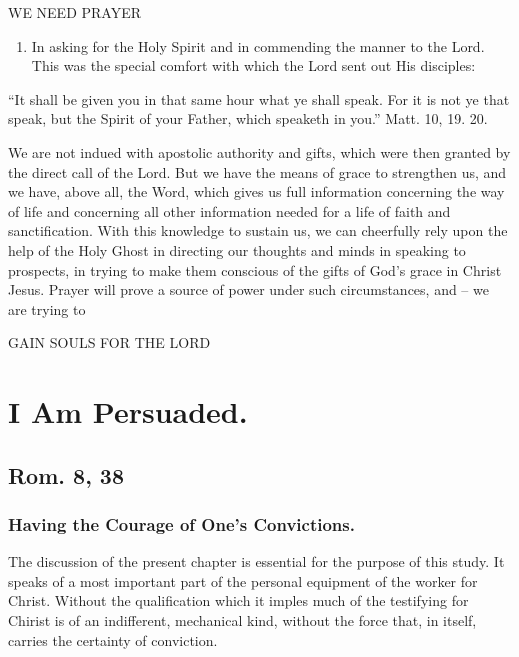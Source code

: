 \documentclass[
]{book}
\providecommand{\tightlist}{%
  \setlength{\itemsep}{0pt}\setlength{\parskip}{0pt}}
\begin{document}
WE NEED PRAYER

\begin{enumerate}
\def\labelenumi{\alph{enumi}.}
\setcounter{enumi}{4}
\tightlist
\item
  In asking for the Holy Spirit and in commending the manner to the Lord. This was the special comfort with which the Lord sent out His disciples:
\end{enumerate}

``It shall be given you in that same hour what ye shall speak. For it is not ye that speak, but the Spirit of your Father, which speaketh in you.'' Matt. 10, 19. 20.

We are not indued with apostolic authority and gifts, which were then granted by the direct call of the Lord. But we have the means of grace to strengthen us, and we have, above all, the Word, which gives us full information concerning the way of life and concerning all other information needed for a life of faith and sanctification. With this knowledge to sustain us, we can cheerfully rely upon the help of the Holy Ghost in directing our thoughts and minds in speaking to prospects, in trying to make them conscious of the gifts of God's grace in Christ Jesus. Prayer will prove a source of power under such circumstances, and -- we are trying to

\begin{center} GAIN SOULS FOR THE LORD \end{center}

\chapter{I Am Persuaded.}\label{i-am-persuaded.}

\section*{Rom. 8, 38}\label{rom.-8-38}

\subsection*{Having the Courage of One's Convictions.}\label{having-the-courage-of-ones-convictions.}

The discussion of the present chapter is essential for the purpose of this study. It speaks of a most important part of the personal equipment of the worker for Christ. Without the qualification which it imples much of the testifying for Chirist is of an indifferent, mechanical kind, without the force that, in itself, carries the certainty of conviction.
\end{document}
